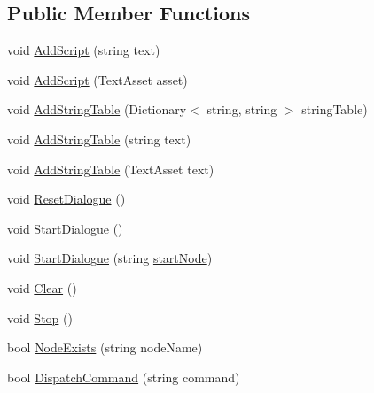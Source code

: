 \subsection*{Public Member Functions}
\begin{DoxyCompactItemize}
\item 
void \hyperlink{a00073_a88d161b1be7c99b1e202e6ae9e0d1e73}{Add\-Script} (string text)
\item 
void \hyperlink{a00073_a2fd7f165afff0b8bc2004f10ce4537dd}{Add\-Script} (Text\-Asset asset)
\item 
void \hyperlink{a00073_a2e9d9472b4dba699ef72ab558c89e009}{Add\-String\-Table} (Dictionary$<$ string, string $>$ string\-Table)
\item 
void \hyperlink{a00073_a08d4eb5038b23aad6d59d74ac89806a9}{Add\-String\-Table} (string text)
\item 
void \hyperlink{a00073_abc595a490988ca712d37af540c2e0df9}{Add\-String\-Table} (Text\-Asset text)
\item 
void \hyperlink{a00073_ac08900ac15b3ca90446b9454c7fd117e}{Reset\-Dialogue} ()
\item 
void \hyperlink{a00073_ab083d0ac60b41958b591c632e3c3a53e}{Start\-Dialogue} ()
\item 
void \hyperlink{a00073_abda765c6804853e264282a0f45920cd3}{Start\-Dialogue} (string \hyperlink{a00073_a61c92b8d2228d01d8ac123b73bbb41a0}{start\-Node})
\item 
void \hyperlink{a00073_a09f5769c0c0921a21e659fed0af09c01}{Clear} ()
\item 
void \hyperlink{a00073_af94e66876098f8b187181014973645e6}{Stop} ()
\item 
bool \hyperlink{a00073_aadf7711b9ba101d6ce8ba491d9c5a4c3}{Node\-Exists} (string node\-Name)
\item 
bool \hyperlink{a00073_a7b200f8ddcf77f50906a6341aadeb671}{Dispatch\-Command} (string command)
\end{DoxyCompactItemize}
